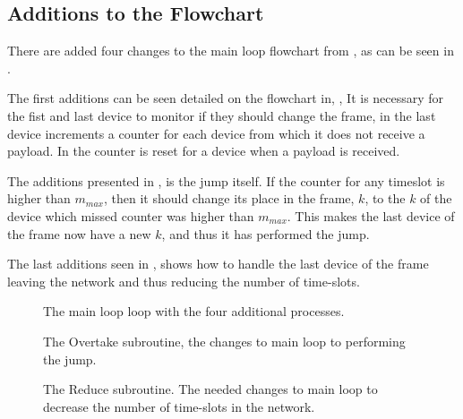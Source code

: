 \subsection{Additions to the Flowchart}
There are added four changes to the main loop flowchart from , as can be seen in .

The first additions can be seen detailed on the flowchart in, ,
It is necessary for the fist and last device to monitor if they should change the frame, in  the last device increments a counter for each device from which it does not receive a payload.
In  the counter is reset for a device when a payload is received.

The additions presented in , is the jump itself.
If the counter for any timeslot is higher than $m_{max}$, then it should change its place in the frame, $k$, to the $k$ of the device which missed counter was higher than $m_{max}$.
This makes the last device of the frame now have a new $k$, and thus it has performed the jump.	

The last additions seen in , shows how to handle the last device of the frame leaving the network and thus reducing the number of time-slots.
                                                                         
\begin{figure}[!p] 
\vspace{-15pt} 
\centering
\footnotesize

\caption{The main loop loop with the four additional processes.}
\label{fig:mainFrameDefrag}   
\end{figure}  

  

\begin{figure}[!p]
\centering
\footnotesize

\caption{The Overtake subroutine, the changes to main loop to performing the jump.}
\label{fig:jd2}    
\end{figure}

\begin{figure}[!p]
\centering
\footnotesize

\caption{The Reduce subroutine. The needed changes to main loop to decrease the number of time-slots in the network.}
\label{fig:jd3}    
\end{figure}   
